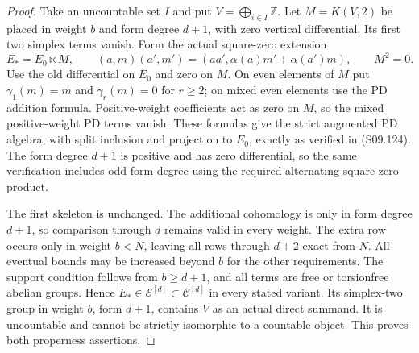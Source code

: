 \begin{proof}
Take an uncountable set $I$ and put
$V=\bigoplus_{i\in I}\mathbb Z$. Let $M=K(V,2)$ be placed
in weight $b$ and form degree $d+1$, with zero vertical
differential. Its first two simplex terms vanish. Form the
actual square-zero extension
\[
 E_*=E_0\ltimes M,\qquad
 (a,m)(a',m')=(aa',\alpha(a)m'+\alpha(a')m),\qquad M^2=0.
 \tag{S09.160}
\]
Use the old differential on $E_0$ and zero on $M$. On even
elements of $M$ put $\gamma_1(m)=m$ and
$\gamma_r(m)=0$ for $r\geq2$; on mixed even elements use the
PD addition formula. Positive-weight coefficients act as zero
on $M$, so the mixed positive-weight PD terms vanish. These
formulas give the strict augmented PD algebra, with split
inclusion and projection to $E_0$, exactly as verified in
(S09.124). The form degree $d+1$ is positive and has zero
differential, so the same verification includes odd form degree
using the required alternating square-zero product.

The first skeleton is unchanged. The additional cohomology is
only in form degree $d+1$, so comparison through $d$ remains
valid in every weight. The extra row occurs only in weight
$b<N$, leaving all rows through $d+2$ exact from $N$.
All eventual bounds may be increased beyond $b$ for the other
requirements. The support condition follows from $b\geq d+1$,
and all terms are free or torsionfree abelian groups. Hence
$E_*\in\mathcal E^{[d]}\subset\mathcal C^{[d]}$ in every
stated variant. Its simplex-two group in weight $b$, form
$d+1$, contains $V$ as an actual direct summand. It is
uncountable and cannot be strictly isomorphic to a countable
object. This proves both properness assertions.
\end{proof}
